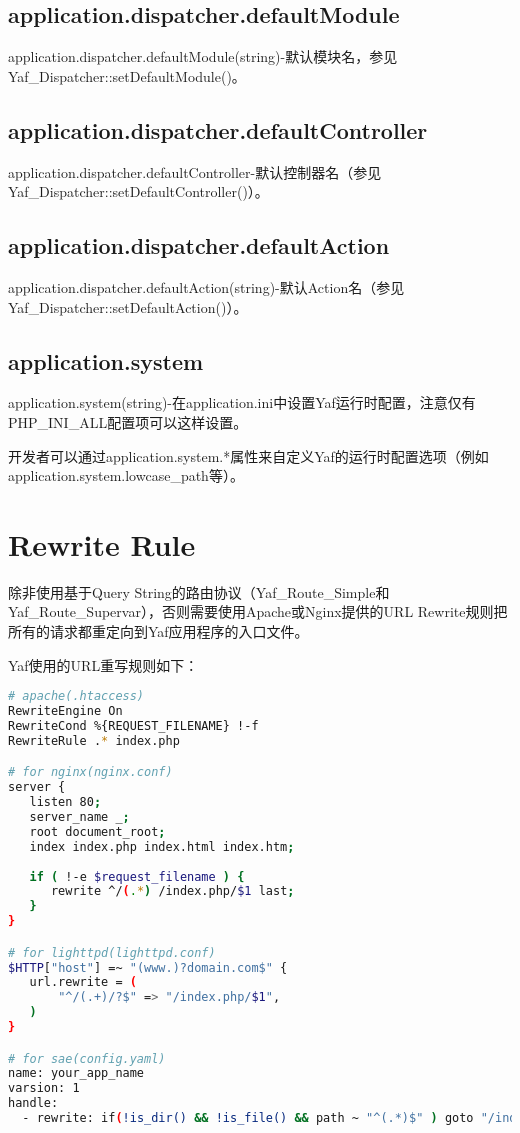 \subsection{application.dispatcher.defaultModule}


application.dispatcher.defaultModule(string)-默认模块名，参见Yaf\_Dispatcher::setDefaultModule()。


\subsection{application.dispatcher.defaultController}

application.dispatcher.defaultController-默认控制器名（参见Yaf\_Dispatcher::setDefaultController()）。

\subsection{application.dispatcher.defaultAction}

application.dispatcher.defaultAction(string)-默认Action名（参见 Yaf\_Dispatcher::setDefaultAction()）。

\subsection{application.system}



application.system(string)-在application.ini中设置Yaf运行时配置，注意仅有PHP\_INI\_ALL配置项可以这样设置。

开发者可以通过application.system.*属性来自定义Yaf的运行时配置选项（例如application.system.lowcase\_path等）。

\section{Rewrite Rule}


除非使用基于Query String的路由协议（Yaf\_Route\_Simple和Yaf\_Route\_Supervar），否则需要使用Apache或Nginx提供的URL Rewrite规则把所有的请求都重定向到Yaf应用程序的入口文件。


Yaf使用的URL重写规则如下：


\begin{lstlisting}[language=bash]
# apache(.htaccess)
RewriteEngine On
RewriteCond %{REQUEST_FILENAME} !-f
RewriteRule .* index.php

# for nginx(nginx.conf)
server {
   listen 80;
   server_name _;
   root document_root;
   index index.php index.html index.htm;
   
   if ( !-e $request_filename ) {
      rewrite ^/(.*) /index.php/$1 last;
   }
}

# for lighttpd(lighttpd.conf)
$HTTP["host"] =~ "(www.)?domain.com$" {
   url.rewrite = (
       "^/(.+)/?$" => "/index.php/$1",
   )
}

# for sae(config.yaml)
name: your_app_name
varsion: 1
handle: 
  - rewrite: if(!is_dir() && !is_file() && path ~ "^(.*)$" ) goto "/index.php"
\end{lstlisting}


